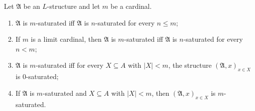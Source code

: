 \begin{proposition}[28.5]
\label{prop:properties-of-m-saturated}
Let $\mathfrak{A}$ be an $L$-structure and let $m$ be a cardinal.
\begin{enumerate}
\item[(i)] $\mathfrak{A}$ is $m$-saturated iff $\mathfrak{A}$ is $n$-saturated for every $n \leq m$;
\item[(ii)] If $m$ is a limit cardinal, then $\mathfrak{A}$ is $m$-saturated iff $\mathfrak{A}$ is $n$-saturated for every $n < m$;
\item[(iii)] $\mathfrak{A}$ is $m$-saturated iff for every $X \subseteq A$ with $|X| < m$, the structure $(\mathfrak{A}, x)_{x \in X}$ is $0$-saturated;
\item[(iv)] If $\mathfrak{A}$ is $m$-saturated and $X \subseteq A$ with $|X| < m$, then $(\mathfrak{A}, x)_{x \in X}$ is $m$-saturated.
\end{enumerate}
\end{proposition}
